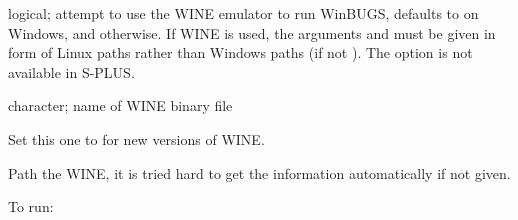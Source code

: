 \begin{Arguments}
\begin{ldescription}
\item[\code{useWINE}] logical; attempt to use the WINE emulator to run WinBUGS,
defaults to  on Windows, and  otherwise.
If WINE is used, the arguments  and  must be given in form of Linux paths
rather than Windows paths (if not ).
The  option is not available in S-PLUS.
\item[\code{WINE}] character; name of WINE binary file
\item[\code{newWINE}] Set this one to  for new versions of WINE.
\item[\code{WINEPATH}] Path the WINE, it is tried hard to get the information automatically if not given.
\end{ldescription}
\end{Arguments}
\begin{Details}\relax
To run:
\end{Details}
